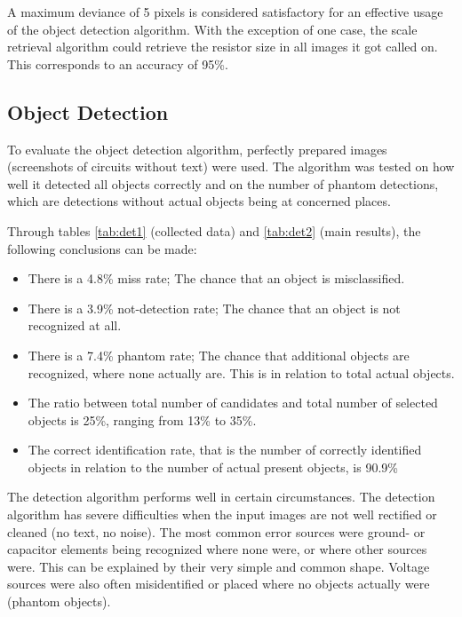 \documentclass[10pt,twocolumn,letterpaper]{article}
\begin{document}
A maximum deviance of 5 pixels is considered satisfactory for an effective usage of the object detection algorithm. With the exception of one case, the scale retrieval algorithm could retrieve the resistor size in all images it got called on. This corresponds to an accuracy of 95\%.

\subsection{Object Detection}

To evaluate the object detection algorithm, perfectly prepared images (screenshots of circuits without text) were used. The algorithm was tested on how well it detected all objects correctly and on the number of phantom detections, which are detections without actual objects being at concerned places.
\par
Through tables \ref{tab:det1} (collected data) and \ref{tab:det2} (main results), the following conclusions can be made:
\begin{itemize}
	\item There is a 4.8\% miss rate; The chance that an object is misclassified.
	\item There is a 3.9\% not-detection rate; The chance that an object is not recognized at all.
	\item There is a 7.4\% phantom rate; The chance that additional objects are recognized, where none actually are. This is in relation to total actual objects.
	\item The ratio between total number of candidates and total number of selected objects is 25\%, ranging from 13\% to 35\%.
	\item The correct identification rate, that is the number of correctly identified objects in relation to the number of actual present objects, is 90.9\%
\end{itemize}
\par

The detection algorithm performs well in certain circumstances. The detection algorithm has severe difficulties when the input images are not well rectified or cleaned (no text, no noise). The most common error sources were ground- or capacitor elements being recognized where none were, or where other sources were. This can be explained by their very simple and common shape. Voltage sources were also often misidentified or placed where no objects actually were (phantom objects).
\par
\end{document}
